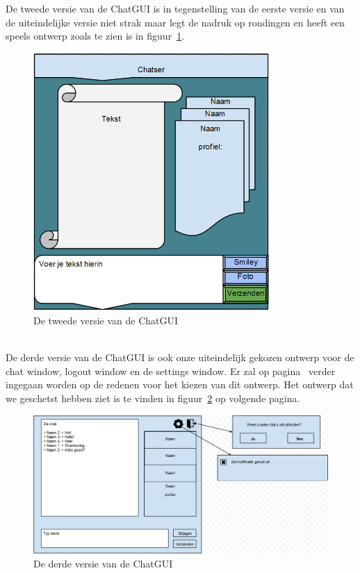 \documentclass[12pt]{article}
\begin{document}
\noindent De tweede versie van de ChatGUI is in tegenstelling van de eerste versie en van de uiteindelijke versie niet strak maar legt de nadruk op rondingen en heeft een speels ontwerp zoals te zien is in figuur~\ref{figure002}.
\begin{figure}[ht]
\begin{center}
\includegraphics[width = 90mm]{ChGDv2}
\caption{De tweede versie van de ChatGUI}
\label{figure002}
\end{center}
\end{figure}
\\

\noindent De derde versie van de ChatGUI is ook onze uiteindelijk gekozen ontwerp voor de chat window, logout window en de settings window. Er zal op pagina~\pageref{ChatGUI} verder ingegaan worden op de redenen voor het kiezen van dit ontwerp. Het ontwerp dat we geschetst hebben ziet is te vinden in figuur~\ref{figure003} op volgende pagina.
\label{ChGv3Chat}
\begin{figure}[ht]
\begin{center}
\includegraphics[width = 150mm]{ChGDv3}
\caption{De derde versie van de ChatGUI}
\label{figure003}
\end{center}
\end{figure}
\\
\end{document}
